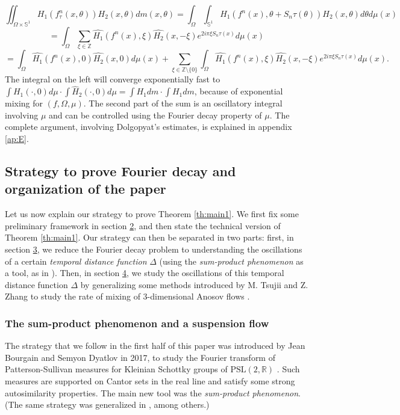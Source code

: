 \documentclass[a4paper]{article}
\theoremstyle{definition}
\begin{document}
$$  \iint_{\Omega \times \mathbb{S}^1} H_1(f_\tau^n(x,\theta)) H_2(x,\theta) dm(x,\theta) =  \int_{\Omega} \int_{\mathbb{S}^1} H_1(f^n(x),\theta+S_n \tau(\theta)) H_2(x,\theta) d\theta d\mu(x) $$
$$ = \int_{\Omega} \sum_{\xi \in \mathbb{Z}}  \widehat{H_1}(f^n(x),\xi) \widehat{H_2}(x,-\xi) e^{2 i \pi \xi S_n \tau(x)}  d\mu(x) $$
$$ = \int_{\Omega} \widehat{H_1}(f^n(x),0) \widehat{H_2}(x,0) d\mu(x) + \sum_{\xi \in \mathbb{Z} \setminus \{0\}} \int_{\Omega}  \widehat{H_1}(f^n(x),\xi) \widehat{H_2}(x,-\xi) e^{2 i \pi \xi S_n \tau(x)}  d\mu(x). $$
The integral on the left will converge exponentially fast to $\int H_1(\cdot,0) d\mu \cdot \int \widehat{H}_2(\cdot,0) d\mu = \int H_1 dm \cdot \int H_1 dm$, because of exponential mixing for $(f,\Omega,\mu)$. The second part of the sum is an oscillatory integral involving $\mu$ and can be controlled using the Fourier decay property of $\mu$. The complete argument, involving Dolgopyat's estimates, is explained in appendix \ref{ap:E}.


\subsection{Strategy to prove Fourier decay and organization of the paper}


Let us now explain our strategy to prove Theorem \ref{th:main1}. We first fix some preliminary framework in section \hyperref[sec:preli]{2}, and then state the technical version of Theorem \ref{th:main1}. Our strategy can then be separated in two parts: first, in section \hyperref[sec:3]{3}, we reduce the Fourier decay problem to understanding the oscillations of a certain \emph{temporal distance function} $\Delta$ (using the \emph{sum-product phenomenon} as a tool, as in \cite{BD17}). Then, in section \hyperref[sec:4]{4}, we study the oscillations of this temporal distance function $\Delta$ by generalizing some methods introduced by M. Tsujii and Z. Zhang to study the rate of mixing of 3-dimensional Anosov flows \cite{TZ20}. 

\subsubsection{The sum-product phenomenon and a suspension flow}

The strategy that we follow in the first half of this paper was introduced by Jean Bourgain and Semyon Dyatlov in 2017, to study the Fourier transform of Patterson-Sullivan measures for Kleinian Schottky groups of $\text{PSL}(2,\mathbb{R})$ \cite{BD17}. Such measures are supported on Cantor sets in the real line and satisfy some strong autosimilarity properties. The main new tool was the \emph{sum-product phenomenon}. (The same strategy was generalized in \cite{LNP19,SS20,Le24,LPS25}, among others.) \\
\end{document}
